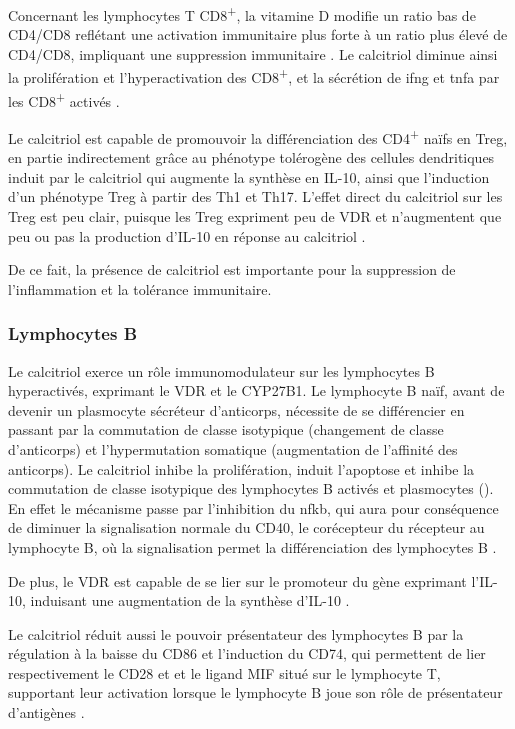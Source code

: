 \documentclass[
  a4paper,
  DIV=11,
  numbers=noendperiod,
  listof=totoc]{scrreprt}
\begin{document}
Concernant les lymphocytes T CD8\textsuperscript{+}, la vitamine D
modifie un ratio bas de CD4/CD8 reflétant une activation immunitaire
plus forte à un ratio plus élevé de CD4/CD8, impliquant une suppression
immunitaire \autocite{Charoenngam.2020}. Le calcitriol diminue ainsi la
prolifération et l'hyperactivation des CD8\textsuperscript{+}, et la
sécrétion de \ac{ifng} et \ac{tnfa} par les CD8\textsuperscript{+}
activés \autocite{Dankers.2017}.

Le calcitriol est capable de promouvoir la différenciation des
CD4\textsuperscript{+} naïfs en \ac{Treg}, en partie indirectement grâce
au phénotype tolérogène des cellules dendritiques induit par le
calcitriol qui augmente la synthèse en IL-10, ainsi que l'induction d'un
phénotype \ac{Treg} à partir des Th1 et Th17. L'effet direct du
calcitriol sur les \ac{Treg} est peu clair, puisque les \ac{Treg}
expriment peu de \ac{VDR} et n'augmentent que peu ou pas la production
d'IL-10 en réponse au calcitriol \autocite{Bishop.2021}.

De ce fait, la présence de calcitriol est importante pour la suppression
de l'inflammation et la tolérance immunitaire.

\subsubsection{Lymphocytes B}\label{lymphocytes-b}

Le calcitriol exerce un rôle immunomodulateur sur les lymphocytes B
hyperactivés, exprimant le \ac{VDR} et le \ac{CYP27B1}. Le lymphocyte B
naïf, avant de devenir un plasmocyte sécréteur d'anticorps, nécessite de
se différencier en passant par la commutation de classe isotypique
(changement de classe d'anticorps) et l'hypermutation somatique
(augmentation de l'affinité des anticorps). Le calcitriol inhibe la
prolifération, induit l'apoptose et inhibe la commutation de classe
isotypique des lymphocytes B activés et plasmocytes
(). En effet le mécanisme passe par l'inhibition du
\ac{nfkb}, qui aura pour conséquence de diminuer la signalisation
normale du CD40, le corécepteur du récepteur au lymphocyte B, où la
signalisation permet la différenciation des lymphocytes B
\autocite{Dankers.2017,Meza-Meza.2022}.

De plus, le \ac{VDR} est capable de se lier sur le promoteur du gène
exprimant l'IL-10, induisant une augmentation de la synthèse d'IL-10
\autocite{Dankers.2017,Martens.2020,Meza-Meza.2022}.

Le calcitriol réduit aussi le pouvoir présentateur des lymphocytes B par
la régulation à la baisse du CD86 et l'induction du CD74, qui permettent
de lier respectivement le CD28 et et le ligand \ac{MIF} situé sur le
lymphocyte T, supportant leur activation lorsque le lymphocyte B joue
son rôle de présentateur d'antigènes
\autocite{Dankers.2017,Martens.2020}.
\end{document}
